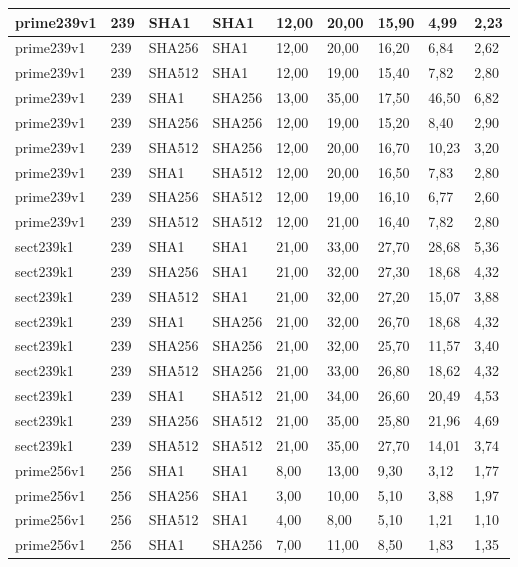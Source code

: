 \begin{longtable}{| l | l | l | l | l |l |l |l |l |}
prime239v1 & 239 & SHA1 & SHA1 & 12,00 & 20,00 & 15,90 & 4,99 & 2,23 \\ \hline 
prime239v1 & 239 & SHA256 & SHA1 & 12,00 & 20,00 & 16,20 & 6,84 & 2,62 \\ \hline 
prime239v1 & 239 & SHA512 & SHA1 & 12,00 & 19,00 & 15,40 & 7,82 & 2,80 \\ \hline 
prime239v1 & 239 & SHA1 & SHA256 & 13,00 & 35,00 & 17,50 & 46,50 & 6,82 \\ \hline 
prime239v1 & 239 & SHA256 & SHA256 & 12,00 & 19,00 & 15,20 & 8,40 & 2,90 \\ \hline 
prime239v1 & 239 & SHA512 & SHA256 & 12,00 & 20,00 & 16,70 & 10,23 & 3,20 \\ \hline 
prime239v1 & 239 & SHA1 & SHA512 & 12,00 & 20,00 & 16,50 & 7,83 & 2,80 \\ \hline 
prime239v1 & 239 & SHA256 & SHA512 & 12,00 & 19,00 & 16,10 & 6,77 & 2,60 \\ \hline 
prime239v1 & 239 & SHA512 & SHA512 & 12,00 & 21,00 & 16,40 & 7,82 & 2,80 \\ \hline 
sect239k1 & 239 & SHA1 & SHA1 & 21,00 & 33,00 & 27,70 & 28,68 & 5,36 \\ \hline 
sect239k1 & 239 & SHA256 & SHA1 & 21,00 & 32,00 & 27,30 & 18,68 & 4,32 \\ \hline 
sect239k1 & 239 & SHA512 & SHA1 & 21,00 & 32,00 & 27,20 & 15,07 & 3,88 \\ \hline 
sect239k1 & 239 & SHA1 & SHA256 & 21,00 & 32,00 & 26,70 & 18,68 & 4,32 \\ \hline 
sect239k1 & 239 & SHA256 & SHA256 & 21,00 & 32,00 & 25,70 & 11,57 & 3,40 \\ \hline 
sect239k1 & 239 & SHA512 & SHA256 & 21,00 & 33,00 & 26,80 & 18,62 & 4,32 \\ \hline 
sect239k1 & 239 & SHA1 & SHA512 & 21,00 & 34,00 & 26,60 & 20,49 & 4,53 \\ \hline 
sect239k1 & 239 & SHA256 & SHA512 & 21,00 & 35,00 & 25,80 & 21,96 & 4,69 \\ \hline 
sect239k1 & 239 & SHA512 & SHA512 & 21,00 & 35,00 & 27,70 & 14,01 & 3,74 \\ \hline 
prime256v1 & 256 & SHA1 & SHA1 & 8,00 & 13,00 & 9,30 & 3,12 & 1,77 \\ \hline 
prime256v1 & 256 & SHA256 & SHA1 & 3,00 & 10,00 & 5,10 & 3,88 & 1,97 \\ \hline 
prime256v1 & 256 & SHA512 & SHA1 & 4,00 & 8,00 & 5,10 & 1,21 & 1,10 \\ \hline 
prime256v1 & 256 & SHA1 & SHA256 & 7,00 & 11,00 & 8,50 & 1,83 & 1,35 \\ \hline 

\end{longtable}
